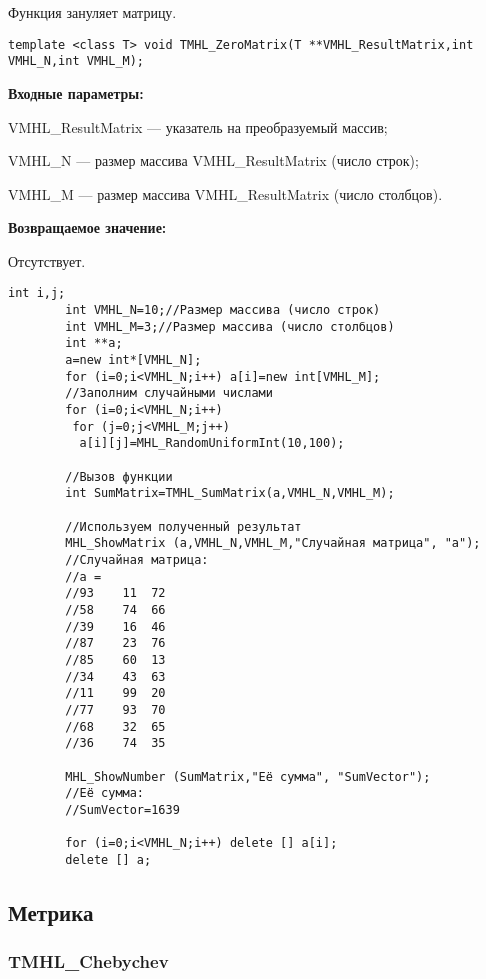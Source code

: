 \documentclass[a4paper,12pt]{article}
\begin{document}
Функция зануляет матрицу.


\begin{lstlisting}[label=code_syntax_TMHL_ZeroMatrix,caption=Синтаксис]
template <class T> void TMHL_ZeroMatrix(T **VMHL_ResultMatrix,int VMHL_N,int VMHL_M);
\end{lstlisting}

\textbf{Входные параметры:}

 VMHL\_ResultMatrix --- указатель на преобразуемый массив;
 
 VMHL\_N --- размер массива VMHL\_ResultMatrix (число строк);
 
 VMHL\_M --- размер массива VMHL\_ResultMatrix (число столбцов).

\textbf{Возвращаемое значение:}

 Отсутствует.


\begin{lstlisting}[label=code_use_TMHL_ZeroMatrix,caption=Пример использования]
        int i,j;
        int VMHL_N=10;//Размер массива (число строк)
        int VMHL_M=3;//Размер массива (число столбцов)
        int **a;
        a=new int*[VMHL_N];
        for (i=0;i<VMHL_N;i++) a[i]=new int[VMHL_M];
        //Заполним случайными числами
        for (i=0;i<VMHL_N;i++)
         for (j=0;j<VMHL_M;j++)
          a[i][j]=MHL_RandomUniformInt(10,100);

        //Вызов функции
        int SumMatrix=TMHL_SumMatrix(a,VMHL_N,VMHL_M);

        //Используем полученный результат
        MHL_ShowMatrix (a,VMHL_N,VMHL_M,"Случайная матрица", "a");
        //Случайная матрица:
        //a =
        //93	11	72
        //58	74	66
        //39	16	46
        //87	23	76
        //85	60	13
        //34	43	63
        //11	99	20
        //77	93	70
        //68	32	65
        //36	74	35

        MHL_ShowNumber (SumMatrix,"Её сумма", "SumVector");
        //Её сумма:
        //SumVector=1639

        for (i=0;i<VMHL_N;i++) delete [] a[i];
        delete [] a;
\end{lstlisting}

\subsection{Метрика}

\subsubsection{TMHL\_Chebychev}\label{TMHL_Chebychev}
\end{document}
